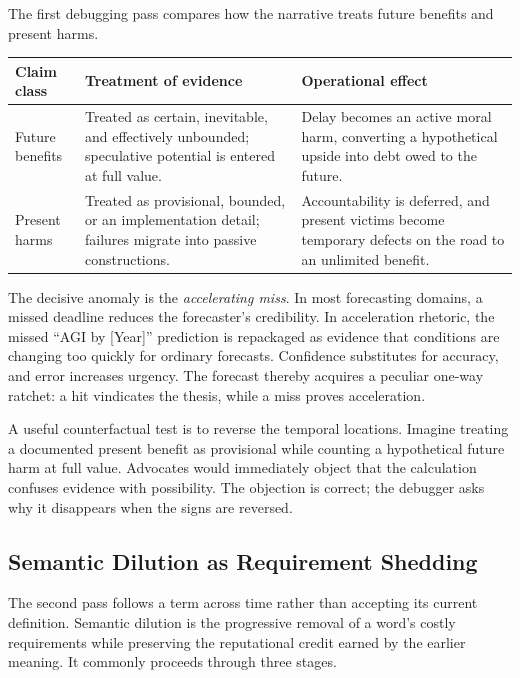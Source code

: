 \documentclass[11pt]{article}
\begin{document}
The first debugging pass compares how the narrative treats future benefits and present harms.

\begin{center}
\small
\begin{tabularx}{\textwidth}{@{}p{}X X@{}}
\toprule
\textbf{Claim class} & \textbf{Treatment of evidence} & \textbf{Operational effect} \\
\midrule
Future benefits & Treated as certain, inevitable, and effectively unbounded; speculative potential is entered at full value. & Delay becomes an active moral harm, converting a hypothetical upside into debt owed to the future. \\
\addlinespace
Present harms & Treated as provisional, bounded, or an implementation detail; failures migrate into passive constructions. & Accountability is deferred, and present victims become temporary defects on the road to an unlimited benefit. \\
\bottomrule
\end{tabularx}
\end{center}

The decisive anomaly is the \emph{accelerating miss}. In most forecasting domains, a missed deadline reduces the forecaster's credibility. In acceleration rhetoric, the missed \enquote{AGI by [Year]} prediction is repackaged as evidence that conditions are changing too quickly for ordinary forecasts. Confidence substitutes for accuracy, and error increases urgency. The forecast thereby acquires a peculiar one-way ratchet: a hit vindicates the thesis, while a miss proves acceleration.

A useful counterfactual test is to reverse the temporal locations. Imagine treating a documented present benefit as provisional while counting a hypothetical future harm at full value. Advocates would immediately object that the calculation confuses evidence with possibility. The objection is correct; the debugger asks why it disappears when the signs are reversed.

\subsection{Semantic Dilution as Requirement Shedding}

The second pass follows a term across time rather than accepting its current definition. Semantic dilution is the progressive removal of a word's costly requirements while preserving the reputational credit earned by the earlier meaning. It commonly proceeds through three stages.
\end{document}
